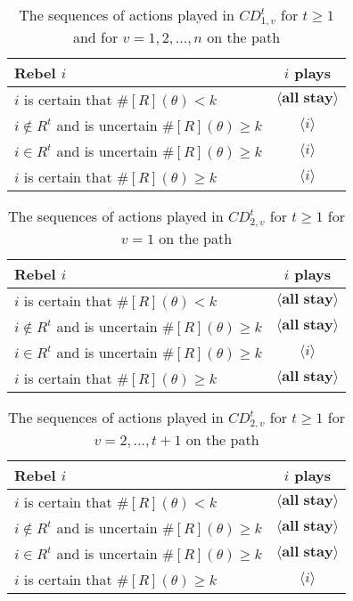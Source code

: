 \documentclass[12pt,letter]{article}
\theoremstyle{definition}
\theoremstyle{remark}
\theoremstyle{claim}
\begin{document}
\begin{table}[!htbp]
\caption{The sequences of actions played in $CD^t_{1,v}$ for $t\geq 1$ and for $v=1,2,...,n$ on the path}
\label{Table_cdt1v}
\begin{center}
\begin{tabular}{l c}
Rebel $i$ 	 	&  	$i$ plays		 \\
\hline
\hline
$i$ is certain that $\#[R](\theta)<k$ 	& 	$\langle \textbf{all stay} \rangle$	\\
$i\notin R^{t}$ and is uncertain $\#[R](\theta)\geq k$	& 	$\langle i \rangle$	\\
$i\in R^{t}$ and is uncertain $\#[R](\theta)\geq k$ &  $\langle i \rangle$  \\
$i$ is certain that $\#[R](\theta)\geq k$ &  $\langle i \rangle$  \\
\hline
\end{tabular}
\end{center}
\end{table}


\begin{table}[!htbp]
\caption{The sequences of actions played in $CD^t_{2,v}$ for $t\geq 1$ for $v=1$ on the path}
\label{Table_cdt21}
\begin{center}
\begin{tabular}{l c}
Rebel $i$ 	 	&  	$i$ plays		 \\
\hline
\hline
$i$ is certain that $\#[R](\theta)<k$ 	& 	$\langle \textbf{all stay} \rangle$	\\
$i\notin R^{t}$ and is uncertain $\#[R](\theta)\geq k$	& 	$\langle \textbf{all stay} \rangle$	\\
$i\in R^{t}$ and is uncertain $\#[R](\theta)\geq k$ &  $\langle i \rangle$  \\
$i$ is certain that $\#[R](\theta)\geq k$ &  $\langle \textbf{all stay} \rangle$  \\
\hline
\end{tabular}
\end{center}
\end{table}


\begin{table}[!htbp]
\caption{The sequences of actions played in $CD^t_{2,v}$ for $t\geq 1$ for $v=2,...,t+1$ on the path}
\label{Table_cdt2t}
\begin{center}
\begin{tabular}{l c}
Rebel $i$ 	 	&  	$i$ plays		 \\
\hline
\hline
$i$ is certain that $\#[R](\theta)<k$ 	& 	$\langle \textbf{all stay} \rangle$	\\
$i\notin R^{t}$ and is uncertain $\#[R](\theta)\geq k$	& 	$\langle \textbf{all stay} \rangle$	\\
$i\in R^{t}$ and is uncertain $\#[R](\theta)\geq k$ &  $\langle \textbf{all stay} \rangle$  \\
$i$ is certain that $\#[R](\theta)\geq k$ &  $\langle i \rangle$  \\
\hline
\end{tabular}
\end{center}
\end{table}
\end{document}
